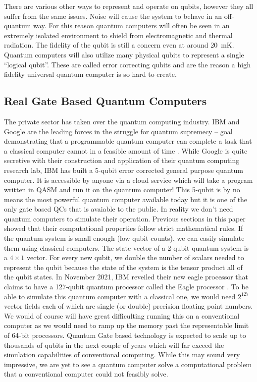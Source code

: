 \documentclass[conference]{IEEEtran}
\begin{document}
There are various other ways to represent and operate on qubits, however they all suffer from the same issues. Noise will cause the system to behave in an off-quantum way. For this reason quantum computers will often be seen in an extremely isolated environment to shield from electromagnetic and thermal radiation. The fidelity of the qubit is still a concern even at around \SI{20}{\milli\kelvin}. Quantum computers will also utilize many physical qubits to represent a single ``logical qubit''. These are called error correcting qubits and are the reason a high fidelity universal quantum computer is so hard to create.

\subsection{Real Gate Based Quantum Computers}

The private sector has taken over the quantum computing industry. IBM and Google are the leading forces in the struggle for quantum supremecy -- goal demonstrating that a programmable quantum computer can complete a task that a classical computer cannot in a feasible amount of time \cite{b14}. While Google is quite secretive with their construction and application of their quantum computing research lab, IBM has built a 5-qubit error corrected general purpose quantum computer. It is accessible by anyone via a cloud service which will take a program written in QASM and run it on the quantum computer! This 5-qubit is by no means the most powerful quantum computer available today but it is one of the only gate based QCs that is avaiable to the public. In reality we don't need quantum computers to simulate their operation. Previous sections in this paper showed that their computational properties follow strict mathematical rules. If the quantum system is small enough (low qubit counts), we can easily simulate them using classical computers. The state vector of a 2-qubit quantum system is a $4\times 1$ vector. For every new qubit, we double the number of scalars needed to represent the qubit because the state of the system is the tensor product all of the qubit states. In November 2021, IBM reveiled their new eagle processor that claims to have a 127-qubit quantum processor called the Eagle processor \cite{b15}. To be able to simulate this quantum computer with a classical one, we would need $2^{127}$ vector fields each of which are single (or double) precision floating point numbers. We would of course will have great difficulting running this on a conventional computer as we would need to ramp up the memory past the representable limit of 64-bit processors. Quantum Gate based technology is expected to scale up to thousands of qubits in the next couple of years which will far exceed the simulation capabilities of conventional computing. While this may sound very impressive, we are yet to see a quantum computer solve a computational problem that a conventional computer could not feasibly solve.
\end{document}
